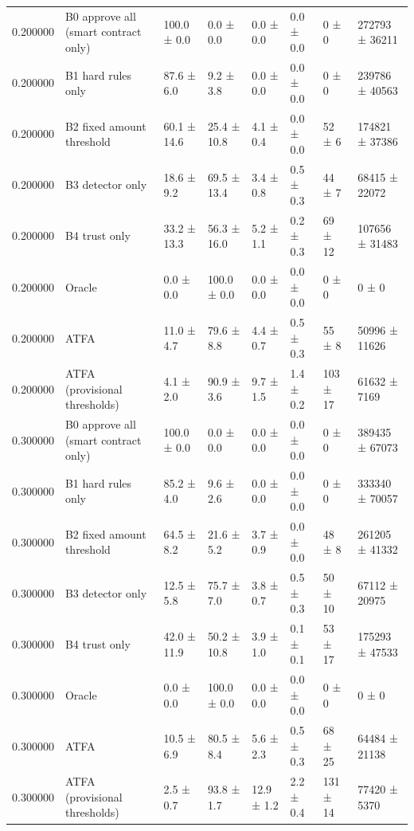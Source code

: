 \begin{tabular}{rlllllll}
0.200000 & B0 approve all (smart contract only) & 100.0 ± 0.0 & 0.0 ± 0.0 & 0.0 ± 0.0 & 0.0 ± 0.0 & 0 ± 0 & 272793 ± 36211 \\
0.200000 & B1 hard rules only & 87.6 ± 6.0 & 9.2 ± 3.8 & 0.0 ± 0.0 & 0.0 ± 0.0 & 0 ± 0 & 239786 ± 40563 \\
0.200000 & B2 fixed amount threshold & 60.1 ± 14.6 & 25.4 ± 10.8 & 4.1 ± 0.4 & 0.0 ± 0.0 & 52 ± 6 & 174821 ± 37386 \\
0.200000 & B3 detector only & 18.6 ± 9.2 & 69.5 ± 13.4 & 3.4 ± 0.8 & 0.5 ± 0.3 & 44 ± 7 & 68415 ± 22072 \\
0.200000 & B4 trust only & 33.2 ± 13.3 & 56.3 ± 16.0 & 5.2 ± 1.1 & 0.2 ± 0.3 & 69 ± 12 & 107656 ± 31483 \\
0.200000 & Oracle & 0.0 ± 0.0 & 100.0 ± 0.0 & 0.0 ± 0.0 & 0.0 ± 0.0 & 0 ± 0 & 0 ± 0 \\
0.200000 & ATFA & 11.0 ± 4.7 & 79.6 ± 8.8 & 4.4 ± 0.7 & 0.5 ± 0.3 & 55 ± 8 & 50996 ± 11626 \\
0.200000 & ATFA (provisional thresholds) & 4.1 ± 2.0 & 90.9 ± 3.6 & 9.7 ± 1.5 & 1.4 ± 0.2 & 103 ± 17 & 61632 ± 7169 \\
0.300000 & B0 approve all (smart contract only) & 100.0 ± 0.0 & 0.0 ± 0.0 & 0.0 ± 0.0 & 0.0 ± 0.0 & 0 ± 0 & 389435 ± 67073 \\
0.300000 & B1 hard rules only & 85.2 ± 4.0 & 9.6 ± 2.6 & 0.0 ± 0.0 & 0.0 ± 0.0 & 0 ± 0 & 333340 ± 70057 \\
0.300000 & B2 fixed amount threshold & 64.5 ± 8.2 & 21.6 ± 5.2 & 3.7 ± 0.9 & 0.0 ± 0.0 & 48 ± 8 & 261205 ± 41332 \\
0.300000 & B3 detector only & 12.5 ± 5.8 & 75.7 ± 7.0 & 3.8 ± 0.7 & 0.5 ± 0.3 & 50 ± 10 & 67112 ± 20975 \\
0.300000 & B4 trust only & 42.0 ± 11.9 & 50.2 ± 10.8 & 3.9 ± 1.0 & 0.1 ± 0.1 & 53 ± 17 & 175293 ± 47533 \\
0.300000 & Oracle & 0.0 ± 0.0 & 100.0 ± 0.0 & 0.0 ± 0.0 & 0.0 ± 0.0 & 0 ± 0 & 0 ± 0 \\
0.300000 & ATFA & 10.5 ± 6.9 & 80.5 ± 8.4 & 5.6 ± 2.3 & 0.5 ± 0.3 & 68 ± 25 & 64484 ± 21138 \\
0.300000 & ATFA (provisional thresholds) & 2.5 ± 0.7 & 93.8 ± 1.7 & 12.9 ± 1.2 & 2.2 ± 0.4 & 131 ± 14 & 77420 ± 5370 \\
\bottomrule
\end{tabular}
